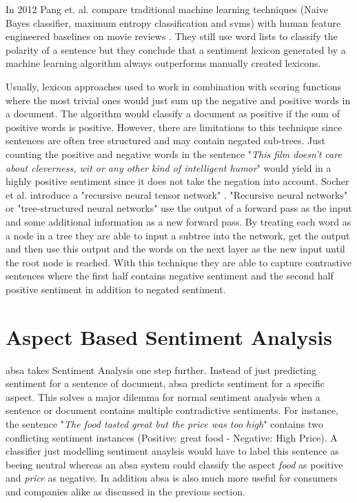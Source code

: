 In 2012 Pang et. al. compare traditional machine learning techniques {(Naive Bayes classifier, maximum entropy classification and \glspl{svm})} with human feature engineered baselines on movie reviews \cite{Pang2012}. They still use word lists to classify the polarity of a sentence but they conclude that a sentiment lexicon generated by a machine learning algorithm always outperforms manually created lexicons.
\medskip


Usually, lexicon approaches used to work in combination with scoring functions where the most trivial ones would just sum up the negative and positive words in a document. The algorithm would classify a document as positive if the sum of positive words is positive. However, there are limitations to this technique since sentences are often tree structured and may contain negated sub-trees. Just counting the positive and negative words in the sentence "\textit{This film doesn't care about cleverness, wit or any other kind of intelligent humor}" would yield in a highly positive sentiment since it does not take the negation into account. Socher et al. introduce a "recursive neural tensor network" \cite{Socher2013}. "Recursive neural networks" or "tree-structured neural networks" use the output of a forward pass as the input and some additional information as a new forward pass. By treating each word as a node in a tree they are able to input a subtree into the network, get the output and then use this output and the words on the next layer as the new input until the root node is reached. With this technique they are able to capture contrastive sentences where the first half contains negative sentiment and the second half positive sentiment in addition to negated sentiment. 
\medskip

\section{Aspect Based Sentiment Analysis}
\label{sec:02_absa}

\acrfull{absa} takes Sentiment Analysis one step further. Instead of just predicting sentiment for a sentence of document, \gls{absa} predicts sentiment for a specific aspect. This solves a major dilemma for normal sentiment analysis when a sentence or document contains multiple contradictive sentiments. For instance, the sentence "\textit{The food tasted great but the price was too high}" contains two conflicting sentiment instances {(Positive: great food - Negative: High Price)}. A classifier just modelling sentiment anaylsis would have to label this sentence as beeing neutral whereas an \gls{absa} system could classify the aspect \textit{food} as positive and \textit{price} as negative. In addition \gls{absa} is also much more useful for consumers and companies alike as discussed in the previous section.
\medskip

